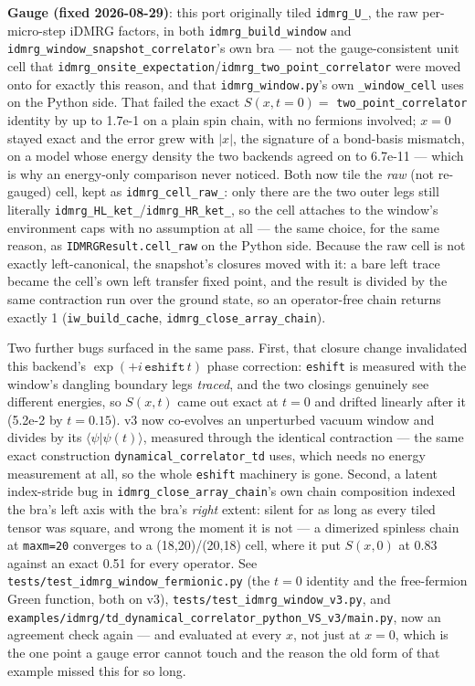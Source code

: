 \documentclass[11pt]{article}
\begin{document}
\textbf{Gauge (fixed 2026-08-29)}: this port originally tiled
\texttt{idmrg\_U\_}, the raw per-micro-step iDMRG factors, in both
\texttt{idmrg\_build\_window} and
\texttt{idmrg\_window\_snapshot\_correlator}'s own bra --- not the
gauge-consistent unit cell that
\texttt{idmrg\_onsite\_expectation}/\texttt{idmrg\_two\_point\_correlator}
were moved onto for exactly this reason, and that
\texttt{idmrg\_window.py}'s own \texttt{\_window\_cell} uses on the Python
side. That failed the exact $S(x,t{=}0) = $
\texttt{two\_point\_correlator} identity by up to 1.7e-1 on a plain spin
chain, with no fermions involved; $x=0$ stayed exact and the error grew
with $|x|$, the signature of a bond-basis mismatch, on a model whose
energy density the two backends agreed on to 6.7e-11 --- which is why an
energy-only comparison never noticed. Both now tile the \emph{raw} (not
re-gauged) cell, kept as \texttt{idmrg\_cell\_raw\_}: only there are the
two outer legs still literally
\texttt{idmrg\_HL\_ket\_}/\texttt{idmrg\_HR\_ket\_}, so the cell attaches
to the window's environment caps with no assumption at all --- the same
choice, for the same reason, as \texttt{IDMRGResult.cell\_raw} on the
Python side. Because the raw cell is not exactly left-canonical, the
snapshot's closures moved with it: a bare left trace became the cell's own
left transfer fixed point, and the result is divided by the same
contraction run over the ground state, so an operator-free chain returns
exactly 1 (\texttt{iw\_build\_cache},
\texttt{idmrg\_close\_array\_chain}).

Two further bugs surfaced in the same pass. First, that closure change
invalidated this backend's $\exp(+i\,\texttt{eshift}\,t)$ phase
correction: \texttt{eshift} is measured with the window's dangling
boundary legs \emph{traced}, and the two closings genuinely see different
energies, so $S(x,t)$ came out exact at $t=0$ and drifted linearly after
it (5.2e-2 by $t=0.15$). v3 now co-evolves an unperturbed vacuum window
and divides by its $\langle\psi|\psi(t)\rangle$, measured through the
identical contraction --- the same exact construction
\texttt{dynamical\_correlator\_td} uses, which needs no energy measurement
at all, so the whole \texttt{eshift} machinery is gone. Second, a latent
index-stride bug in \texttt{idmrg\_close\_array\_chain}'s own chain
composition indexed the bra's left axis with the bra's \emph{right}
extent: silent for as long as every tiled tensor was square, and wrong the
moment it is not --- a dimerized spinless chain at \texttt{maxm=20}
converges to a (18,20)/(20,18) cell, where it put $S(x,0)$ at 0.83 against
an exact 0.51 for every operator. See
\texttt{tests/test\_idmrg\_window\_fermionic.py} (the $t=0$ identity and
the free-fermion Green function, both on v3),
\texttt{tests/test\_idmrg\_window\_v3.py}, and
\texttt{examples/idmrg/td\_dynamical\_correlator\_python\_VS\_v3/main.py},
now an agreement check again --- and evaluated at every $x$, not just at
$x=0$, which is the one point a gauge error cannot touch and the reason
the old form of that example missed this for so long.
\end{document}
